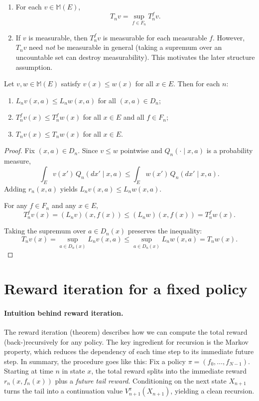 \break

\begin{remark}
\leavevmode
\begin{enumerate}[label=(\alph*)]
  \item For each $v\in\mathcal{\mathbb{M}}(E)$,
  \[
  T_n v = \sup_{f\in F_n} T_n^f v.
  \]
  \item If $v$ is measurable, then $T_n^f v$ is measurable for each measurable $f$.
  However, $T_n v$ need \emph{not} be measurable in general (taking a supremum over an uncountable set can destroy measurability).
  This motivates the later structure assumption.
\end{enumerate}
\end{remark}

\begin{lemma}
Let $v,w\in\mathcal{\mathbb{M}}(E)$ satisfy $v(x)\le w(x)$ for all $x\in E$. Then for each $n$:
\begin{enumerate}[label=(\alph*)]
  \item $L_n v(x,a)\le L_n w(x,a)$ for all $(x,a)\in D_n$;
  \item $T_n^f v(x)\le T_n^f w(x)$ for all $x\in E$ and all $f\in F_n$;
  \item $T_n v(x)\le T_n w(x)$ for all $x\in E$.
\end{enumerate}
\end{lemma}

\begin{proof}
Fix $(x,a)\in D_n$. Since $v\le w$ pointwise and $Q_n(\cdot\mid x,a)$ is a probability measure,
\[
\int_E v(x')\,Q_n(dx'\mid x,a)\le \int_E w(x')\,Q_n(dx'\mid x,a).
\]
Adding $r_n(x,a)$ yields $L_n v(x,a)\le L_n w(x,a)$.

For any $f\in F_n$ and any $x\in E$,
\[
T_n^f v(x)=(L_n v)(x,f(x))\le (L_n w)(x,f(x))=T_n^f w(x).
\]

Taking the supremum over $a\in D_n(x)$ preserves the inequality:
\[
T_n v(x)=\sup_{a\in D_n(x)} L_n v(x,a)\le \sup_{a\in D_n(x)} L_n w(x,a)=T_n w(x).
\]
\end{proof}

\section{Reward iteration for a fixed policy}

\paragraph{Intuition behind reward iteration.} The reward iteration (theorem) describes how we can compute the total reward (back-)recursively for any policy. The key ingredient for recursion is the Markov property, which reduces the dependency of each time step to its immediate future step. In summary, the procedure goes like this: Fix a policy $\pi=(f_0,\dots,f_{N-1})$. Starting at time $n$ in state $x$, the total reward splits into the immediate reward $r_n(x,f_n(x))$ plus a \emph{future tail reward}. Conditioning on the next state $X_{n+1}$ turns the tail into a continuation value $V_{n+1}^{\pi}(X_{n+1})$, yielding a clean recursion.

